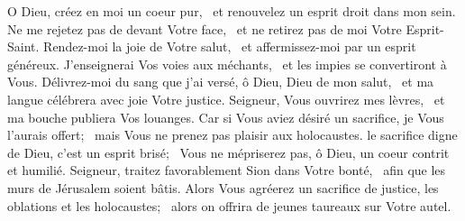 {O Dieu, créez en moi un coeur pur,~\* et renouvelez un esprit droit dans mon sein.}
{Ne me rejetez pas de devant Votre face,~\* et ne retirez pas de moi Votre Esprit-Saint.}
\newpage
{}
{Rendez-moi la joie de Votre salut,~\* et affermissez-moi par un esprit généreux.}
{J'enseignerai Vos voies aux méchants,~\* et les impies se convertiront à Vous.}
{Délivrez-moi du sang que j'ai versé, ô Dieu, Dieu de mon salut,~\* et ma langue célébrera avec joie Votre justice.}
{Seigneur, Vous ouvrirez mes lèvres,~\* et ma bouche publiera Vos louanges.}
{Car si Vous aviez désiré un sacrifice, je Vous l'aurais offert;~\* mais Vous ne prenez pas plaisir aux holocaustes.}
{le sacrifice digne de Dieu, c'est un esprit brisé;~\* Vous ne mépriserez pas, ô Dieu, un coeur contrit et humilié.}
{Seigneur, traitez favorablement Sion dans Votre bonté,~\* afin que les murs de Jérusalem soient bâtis.}
{Alors Vous agréerez un sacrifice de justice, les oblations et les holocaustes;~\* alors on offrira de jeunes taureaux sur Votre autel.}